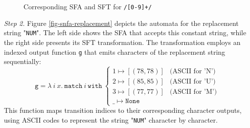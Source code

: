\begin{figure}[h] \centering
{}
\caption{Corresponding SFA and SFT for \texttt{/[0-9]+/}}
\label{fig-snfa-pattern}
\end{figure}

\noindent\emph{Step 2.}
Figure \ref{fig-snfa-replacement} depicts the automata for the replacement string "\texttt{NUM}". The left side shows the SFA that accepts this constant string, while the right side presents its SFT transformation. The transformation employs an indexed output function \texttt{g} that emits characters of the replacement string sequentially:
\[
\texttt{g} = \lambda~i~x.~\texttt{match}~i~\texttt{with}~
\begin{cases}
1 \mapsto [(78, 78)] & \text{(ASCII for 'N')} \\
2 \mapsto [(85, 85)] & \text{(ASCII for 'U')} \\
3 \mapsto [(77, 77)] & \text{(ASCII for 'M')} \\
\_ \mapsto \texttt{None}
\end{cases}
\]
This function maps transition indices to their corresponding character outputs, using ASCII codes to represent the string "\texttt{NUM}" character by character.


